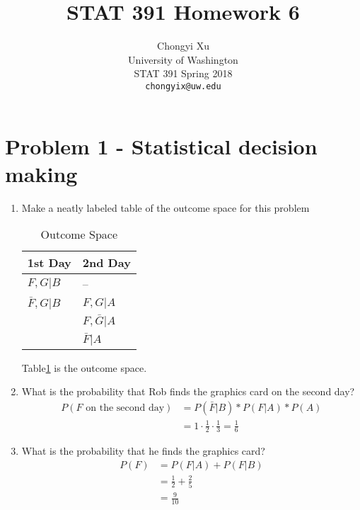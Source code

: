 \documentclass[preprint,12pt]{elsarticle}
\begin{document}
    \title{\LARGE \bf
        STAT 391 Homework 6
        }
        
        \author{ \parbox{3 in}{\centering Chongyi Xu \\
                 University of Washington\\
                 STAT 391 Spring 2018\\
                 {\tt\small chongyix@uw.edu}}
        }
    \maketitle

    \section{Problem 1 - Statistical decision making}
    \begin{enumerate}[label=\alph*]
        \item Make a neatly labeled table of the outcome space for
        this problem
        \begin{table}[]
        	\newpage
			\centering
			\begin{tabular}{|l|l|}
			\hline
			1st Day     & 2nd Day             \\ \hline
			$F,G|B$     	& --                    \\ \hline
			$\bar{F},G|B$ & $F,G|A$                \\ \hline
						& $F,\bar{G}|A$         \\ \hline
						& $\bar{F}|A$         \\ \hline
			\end{tabular}
			\caption{Outcome Space}
			\label{table1}
		\end{table}
		Table\ref{table1} is the outcome space.

        \item What is the probability that Rob finds the graphics card
        on the second day?
        \begin{align*}
			P(F\text{ on the second day}) &= P(\bar{F}|B) * P(F|A) * P(A)\\
			&= 1\cdot \frac{1}{2} \cdot \frac{1}{3} = \frac{1}{6}
        \end{align*}

		\item What is the probability that he finds the graphics card?
		\begin{align*}
			P(F) &= P(F|A) + P(F|B) \\
			&= \frac{1}{2} + \frac{2}{5}\\
			&= \frac{9}{10}
		\end{align*}
		

\end{enumerate}
\end{document}
